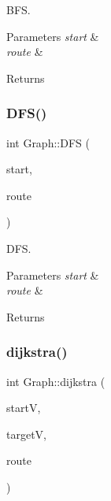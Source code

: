 B\+FS. 


\begin{DoxyParams}{Parameters}
{\em start} & \\
\hline
{\em route} & \\
\hline
\end{DoxyParams}
\begin{DoxyReturn}{Returns}

\end{DoxyReturn}
\mbox{\label{class_graph_ad724e3eb5c87319985f9c4bb1ca8ee1e}} 
\subsubsection{\texorpdfstring{D\+F\+S()}{DFS()}}
{\footnotesize\ttfamily int Graph\+::\+D\+FS (\begin{DoxyParamCaption}\item[{Q\+String}]{start,  }\item[{std\+::vector$<$ Q\+String $>$ $\ast$}]{route }\end{DoxyParamCaption})}



D\+FS. 


\begin{DoxyParams}{Parameters}
{\em start} & \\
\hline
{\em route} & \\
\hline
\end{DoxyParams}
\begin{DoxyReturn}{Returns}

\end{DoxyReturn}
\mbox{\label{class_graph_af88e687c2cefcdad584a64f52c98824e}} 
\subsubsection{\texorpdfstring{dijkstra()}{dijkstra()}}
{\footnotesize\ttfamily int Graph\+::dijkstra (\begin{DoxyParamCaption}\item[{Q\+String}]{startV,  }\item[{Q\+String}]{targetV,  }\item[{std\+::vector$<$ Q\+String $>$ $\ast$}]{route }\end{DoxyParamCaption})}



